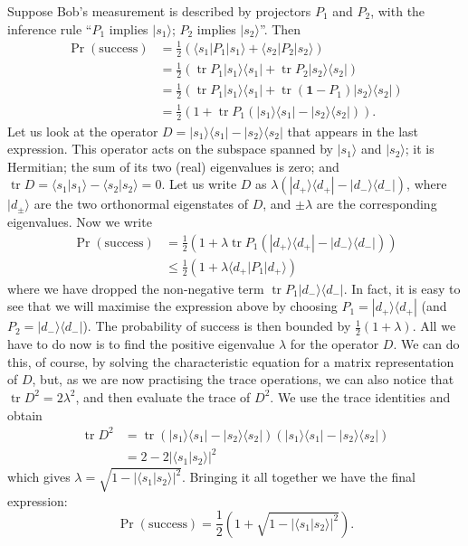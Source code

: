 \documentclass[fleqn]{article}
\begin{document}
Suppose Bob's measurement is described by projectors \(P_1\) and \(P_2\), with the inference rule ``\(P_1\) implies \(|s_1\rangle\); \(P_2\) implies \(|s_2\rangle\)''.
Then
\[
  \begin{aligned}
    \Pr(\text{success})
    &= \frac12\left(
        \langle s_1|P_1|s_1\rangle + \langle s_2|P_2|s_2\rangle
      \right)
  \\&= \frac12\left(
        \operatorname{tr}P_1|s_1\rangle\langle s_1| + \operatorname{tr}P_2|s_2\rangle\langle s_2|
      \right)
  \\&= \frac12\left(
        \operatorname{tr}P_1|s_1\rangle\langle s_1| + \operatorname{tr}(\mathbf{1}-P_1)|s_2\rangle\langle s_2|
      \right)
  \\&= \frac12\left(
        1 + \operatorname{tr}P_1\left( |s_1\rangle\langle s_1| - |s_2\rangle\langle s_2| \right)
      \right).
\end{aligned}
\]
Let us look at the operator \(D = |s_1\rangle\langle s_1| - |s_2\rangle\langle s_2|\) that appears in the last expression.
This operator acts on the subspace spanned by \(|s_1\rangle\) and \(|s_2\rangle\); it is Hermitian; the sum of its two (real) eigenvalues is zero; and \(\operatorname{tr}D=\langle s_1|s_1\rangle-\langle s_2|s_2\rangle=0\).
Let us write \(D\) as \(\lambda(|d_+\rangle\langle d_+| - |d_-\rangle\langle d_-|)\), where \(|d_\pm\rangle\) are the two orthonormal eigenstates of \(D\), and \(\pm\lambda\) are the corresponding eigenvalues.
Now we write
\[
\begin{aligned}
  \Pr (\text{success})
  &= \frac12\left(
      1 + \lambda\operatorname{tr}P_1\left( |d_+\rangle\langle d_+|-|d_-\rangle\langle d_-| \right)
    \right)
\\&\leqslant\frac12\left(
      1+\lambda \langle d_+|P_1|d_+\rangle
    \right)
\end{aligned}
\]
where we have dropped the non-negative term \(\operatorname{tr}P_1|d_-\rangle\langle d_-|\).
In fact, it is easy to see that we will maximise the expression above by choosing \(P_1 = |d_+\rangle\langle d_+|\) (and \(P_2 = |d_-\rangle\langle d_-|\)).
The probability of success is then bounded by \(\frac12(1+\lambda)\).
All we have to do now is to find the positive eigenvalue \(\lambda\) for the operator \(D\).
We can do this, of course, by solving the characteristic equation for a matrix representation of \(D\), but, as we are now practising the trace operations, we can also notice that \(\operatorname{tr}D^2 = 2\lambda^2\), and then evaluate the trace of \(D^2\).
We use the trace identities and obtain
\[
  \begin{aligned}
    \operatorname{tr}D^2
    &= \operatorname{tr}\left( |s_1\rangle\langle s_1|-|s_2\rangle\langle s_2| \right) \left( |s_1\rangle\langle s_1|-|s_2\rangle\langle s_2| \right)
  \\&= 2-2|\langle s_1|s_2\rangle|^2
  \end{aligned}
\]
which gives \(\lambda = \sqrt{1-|\langle s_1|s_2\rangle|^2}\).
Bringing it all together we have the final expression:
\[
 \Pr (\text{success})
 = \frac12\left( 1+ \sqrt{1-|\langle s_1|s_2\rangle|^2} \right).
\]
\end{document}
